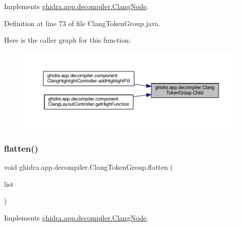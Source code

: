 Implements \mbox{\hyperlink{interfaceghidra_1_1app_1_1decompiler_1_1_clang_node_a7bf351bf5951fb71a5c55fdb311736be}{ghidra.\+app.\+decompiler.\+Clang\+Node}}.



Definition at line 73 of file Clang\+Token\+Group.\+java.

Here is the caller graph for this function\+:
\nopagebreak
\begin{figure}[H]
\begin{center}
\leavevmode
\includegraphics[width=350pt]{classghidra_1_1app_1_1decompiler_1_1_clang_token_group_a46fb87fe558080bdc0dd85072e915e90_icgraph}
\end{center}
\end{figure}
\mbox{\label{classghidra_1_1app_1_1decompiler_1_1_clang_token_group_ac469bdd22ba48a2941a40779f2e4630a}} 
\subsubsection{\texorpdfstring{flatten()}{flatten()}}
{\footnotesize\ttfamily void ghidra.\+app.\+decompiler.\+Clang\+Token\+Group.\+flatten (\begin{DoxyParamCaption}\item[{\mbox{\hyperlink{xml_8hh_ab5ab62f46b3735557c125f91b40ac155}{List}}$<$ \mbox{\hyperlink{interfaceghidra_1_1app_1_1decompiler_1_1_clang_node}{Clang\+Node}} $>$}]{list }\end{DoxyParamCaption})\hspace{0.3cm}{\ttfamily [inline]}}



Implements \mbox{\hyperlink{interfaceghidra_1_1app_1_1decompiler_1_1_clang_node_a0283101b063f37008afb65626cb21f74}{ghidra.\+app.\+decompiler.\+Clang\+Node}}.



